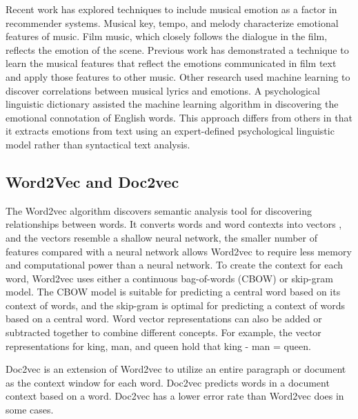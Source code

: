 \documentclass[10pt,twocolumn]{article}
\begin{document}
Recent work has explored techniques to include musical emotion as a factor in recommender systems.  Musical key, tempo, and melody characterize emotional features of music.  Film music, which closely follows the dialogue in the film, reflects the emotion of the scene.  Previous work has demonstrated a technique to learn the musical features that reflect the emotions communicated in film text and apply those features to other music. \cite{a2}  Other research used machine learning to discover correlations between musical lyrics and emotions. \cite{a3}  A psychological linguistic dictionary assisted the machine learning algorithm in discovering the emotional connotation of English words.  This approach differs from others in that it extracts emotions from text using an expert-defined psychological linguistic model rather than syntactical text analysis.

\subsection{Word2Vec and Doc2vec}
The Word2vec algorithm discovers semantic analysis tool for discovering relationships between words.  It converts words and word contexts into vectors \cite{a4,a5,a6}, and the vectors resemble a shallow neural network, the smaller number of features compared with a neural network allows Word2vec to require less memory and computational power than a neural network.  To create the context for each word, Word2vec uses either a continuous bag-of-words (CBOW) or skip-gram model.  The CBOW model is suitable for predicting a central word based on its context of words, and the skip-gram is optimal for predicting a context of words based on a central word.   Word vector representations can also be added or subtracted together to combine different concepts.  For example, the vector representations for king, man, and queen hold that king - man = queen.

Doc2vec is an extension of Word2vec to utilize an entire paragraph or document as the context window for each word. \cite{a7,a8}  Doc2vec predicts words in a document context based on a word.  Doc2vec has a lower error rate than Word2vec does in some cases.
\end{document}
